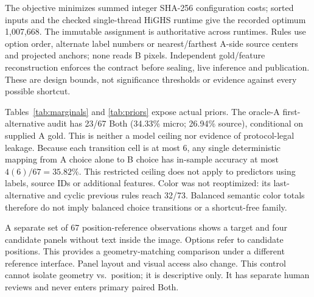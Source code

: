 \documentclass[10pt,twocolumn,letterpaper]{article}
\begin{document}
The objective minimizes summed integer SHA-256 configuration costs;
sorted inputs and the checked single-thread HiGHS runtime give the
recorded optimum 1,007,668. The immutable assignment is authoritative
across runtimes. Rules use option order, alternate label numbers or
nearest/farthest A-side source centers and projected anchors; none reads
B pixels. Independent gold/feature reconstruction enforces the contract
before sealing, live inference and publication. These are design bounds,
not significance thresholds or evidence against every possible shortcut.

Tables~\ref{tab:marginals} and \ref{tab:priors} expose actual priors.
The oracle-A first-alternative audit has 23/67 Both
(34.33\% micro; 26.94\% source), conditional on supplied A gold.
This is neither a model ceiling nor evidence of protocol-legal leakage.
Because each transition cell is at most
6, any single deterministic mapping from A choice alone to B choice has
in-sample accuracy at most $4(6)/67=35.82\%$. This restricted ceiling
does not apply to predictors using labels, source IDs or additional
features. Color was not reoptimized: its last-alternative and cyclic
previous rules reach 32/73. Balanced semantic color totals therefore
do not imply balanced choice transitions or a shortcut-free family.

\begin{table}[t]
\centering\small
\caption{Choice-ID gold counts beside the planned experiment inventory.
Color is frozen; only Part-type was optimized. Both families cover
24 sources. Actual human qualification is 0/280 primary endpoints.}
\label{tab:marginals}

\end{table}

\begin{table}[t]
\centering\small
\caption{Deterministic B accuracy (\%), micro and equal-source.
$^\dagger$Oracle supplies correct A; these rules read no B image, so
their B accuracy equals Both. Fixed choices have Both=0. These
are stimulus audits, not learned-model scores. All 13 Part-type
oracle rules, intervals and individual errors are released.}
\label{tab:priors}
\setlength{\tabcolsep}{4pt}

\end{table}

A separate set of 67 position-reference observations shows a target
and four candidate panels without text inside the image. Options
refer to candidate positions. This provides a geometry-matching
comparison under a different reference interface. Panel layout and
visual access also change. This control cannot isolate geometry
vs.\ position; it is descriptive only. It has separate human reviews
and never enters primary paired Both.
\end{document}
